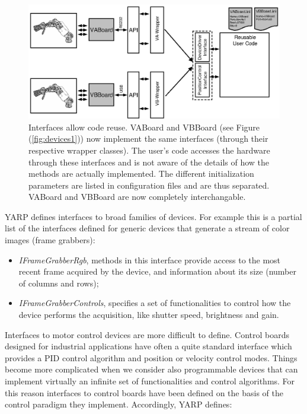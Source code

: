 \begin{figure}[tbp]
\centerline{
\includegraphics[width=24cm]{fig-devices2}
}
\caption{Interfaces allow code reuse. VABoard and VBBoard (see 
Figure (\ref{fig:devices1})) now implement
the same interfaces (through their respective wrapper classes). The user's 
code accesses the hardware through these interfaces and is not aware of 
the details of how the methods are actually implemented. The different 
initialization parameters are listed in configuration files and are thus 
separated. VABoard and VBBoard are now completely interchangable.}
\label{fig:devices2}
\end{figure}

YARP defines interfaces to broad families of devices. For 
example this is a partial list of the interfaces defined for generic 
devices that generate a stream of color images (frame grabbers):

\begin{itemize}

\item \emph{IFrameGrabberRgb}, methods in this interface 
provide access to the most recent frame acquired by the device, and 
information about its size (number of columns and rows);

\item \emph{IFrameGrabberControls}, specifies a set of functionalities 
to control how the device performs the acquisition, like shutter speed, 
brightness and gain.

\end{itemize}

Interfaces to motor control devices are more difficult to define. Control 
boards designed for industrial applications have often a quite standard 
interface which provides a PID control algorithm and position or velocity 
control modes. Things become more complicated when we consider also 
programmable devices that can implement virtually an infinite set of 
functionalities and control algorithms. 
For this reason interfaces to control boards have been defined on the basis 
of the control paradigm they implement. Accordingly, YARP defines:

